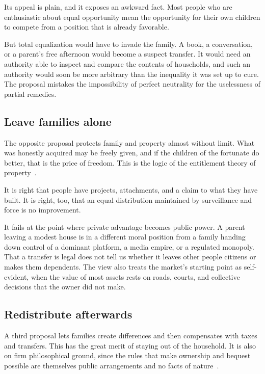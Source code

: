 \documentclass[12pt,a4paper]{book}
\begin{document}
Its appeal is plain, and it exposes an awkward fact. Most people who are enthusiastic about equal opportunity mean the opportunity for their own children to compete from a position that is already favorable.

But total equalization would have to invade the family. A book, a conversation, or a parent's free afternoon would become a suspect transfer. It would need an authority able to inspect and compare the contents of households, and such an authority would soon be more arbitrary than the inequality it was set up to cure. The proposal mistakes the impossibility of perfect neutrality for the uselessness of partial remedies.

\subsection{Leave families alone}

The opposite proposal protects family and property almost without limit. What was honestly acquired may be freely given, and if the children of the fortunate do better, that is the price of freedom. This is the logic of the entitlement theory of property~\cite{Nozick1974}.

It is right that people have projects, attachments, and a claim to what they have built. It is right, too, that an equal distribution maintained by surveillance and force is no improvement.

It fails at the point where private advantage becomes public power. A parent leaving a modest house is in a different moral position from a family handing down control of a dominant platform, a media empire, or a regulated monopoly. That a transfer is legal does not tell us whether it leaves other people citizens or makes them dependents. The view also treats the market's starting point as self-evident, when the value of most assets rests on roads, courts, and collective decisions that the owner did not make.

\subsection{Redistribute afterwards}

A third proposal lets families create differences and then compensates with taxes and transfers. This has the great merit of staying out of the household. It is also on firm philosophical ground, since the rules that make ownership and bequest possible are themselves public arrangements and no facts of nature~\cite{MurphyNagel2002}.
\end{document}
